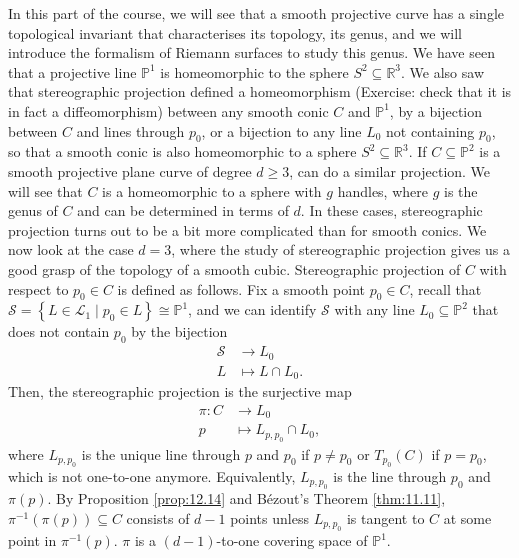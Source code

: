 \documentclass{article}
\newcommand{\R}{\mathbb{R}}
\renewcommand{\P}{\mathbb{P}}
\renewcommand{\L}{\mathcal{L}}
\renewcommand{\S}{\mathcal{S}}
\newcommand{\rb}[1]{\left( #1 \right)}
\newcommand{\cb}[1]{\left\{ #1 \right\}}
\theoremstyle{definition}\newtheorem{definition}{Definition}[section]
\theoremstyle{definition}\newtheorem{notation}[definition]{Notation}
\theoremstyle{definition}\newtheorem{remark}[definition]{Remark}
\theoremstyle{definition}\newtheorem{example1}[definition]{Example}
\theoremstyle{definition}\newtheorem{fact}{Fact}
\theoremstyle{definition}\newtheorem{exercise}{Exercise}
\theoremstyle{definition}\newtheorem*{example2}{Example}
\begin{document}
In this part of the course, we will see that a smooth projective curve has a single topological invariant that characterises its topology, its genus, and we will introduce the formalism of Riemann surfaces to study this genus. We have seen that a projective line $ \P^1 $ is homeomorphic to the sphere $ S^2 \subseteq \R^3 $. We also saw that stereographic projection defined a homeomorphism (Exercise: check that it is in fact a diffeomorphism) between any smooth conic $ C $ and $ \P^1 $, by a bijection between $ C $ and lines through $ p_0 $, or a bijection to any line $ L_0 $ not containing $ p_0 $, so that a smooth conic is also homeomorphic to a sphere $ S^2 \subseteq \R^3 $. If $ C \subseteq \P^2 $ is a smooth projective plane curve of degree $ d \ge 3 $, can do a similar projection. We will see that $ C $ is a homeomorphic to a sphere with $ g $ handles, where $ g $ is the genus of $ C $ and can be determined in terms of $ d $. In these cases, stereographic projection turns out to be a bit more complicated than for smooth conics. We now look at the case $ d = 3 $, where the study of stereographic projection gives us a good grasp of the topology of a smooth cubic. Stereographic projection of $ C $ with respect to $ p_0 \in C $ is defined as follows. Fix a smooth point $ p_0 \in C $, recall that $ \S = \cb{L \in \L_1 \mid p_0 \in L} \cong \P^1 $, and we can identify $ \S $ with any line $ L_0 \subseteq \P^2 $ that does not contain $ p_0 $ by the bijection
\begin{align*}
\S & \to L_0 \\
L & \mapsto L \cap L_0.
\end{align*}
Then, the stereographic projection is the surjective map
\begin{align*}
\pi : C & \to L_0 \\
p & \mapsto L_{p, p_0} \cap L_0,
\end{align*}
where $ L_{p, p_0} $ is the unique line through $ p $ and $ p_0 $ if $ p \ne p_0 $ or $ T_{p_0}\rb{C} $ if $ p = p_0 $, which is not one-to-one anymore. Equivalently, $ L_{p, p_0} $ is the line through $ p_0 $ and $ \pi\rb{p} $. By Proposition \ref{prop:12.14} and B\'ezout's Theorem \ref{thm:11.11}, $ \pi^{-1}\rb{\pi\rb{p}} \subseteq C $ consists of $ d - 1 $ points unless $ L_{p, p_0} $ is tangent to $ C $ at some point in $ \pi^{-1}\rb{p} $. $ \pi $ is a $ \rb{d - 1} $-to-one covering space of $ \P^1 $.

\end{document}
